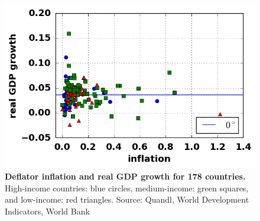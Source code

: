 \begin{figure}[h]
\caption{\label{fig_moneyGDP} \textbf{Deflator inflation and real GDP growth for 178 countries.} High-income countries: blue circles, medium-income: green squares, and low-income: red triangles. {\tiny Source: Quandl, World Development Indicators, World Bank}}
\hspace*{-.5cm}\includegraphics[height = 7.cm]{fig_inflationGDP.png}
\end{figure}